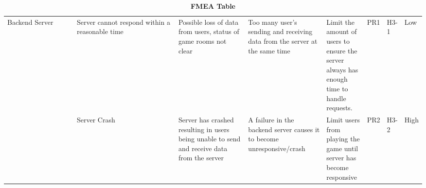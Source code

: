 \documentclass{article}
\begin{document}
\begin{table}[H]
\begin{adjustbox}{width=(/5)}
\begin{tabular}{|p{0.20\linewidth} | p{0.30\linewidth} | p{0.20\linewidth}|  p{0.20\linewidth}|  p{0.30\linewidth}|  p{0.07\linewidth}|  p{0.07\linewidth}|p{0.12\linewidth}| }
          \hline
          Backend Server                   &    Server cannot respond within a reasonable time         &     Possible loss of data from users, status of game rooms not clear    &    Too many user's sending and receiving data from the server at the same time    &     Limit the amount of users to ensure the server always has enough time to handle requests.      &   PR1          &  H3-1            &      Low            \\
                                   &     Server Crash                   & Server has crashed resulting in users being unable to send and receive data from the server                          &   A failure in the backend server causes it to become unresponsive/crash                       &  Limit users from playing the game until server has become responsive                               &  PR2           &  H3-2             &  High                 \\
          \hline
    \end{tabular}
    \end{adjustbox}
    \caption{\bf FMEA Table}
    \label{tab:FMEA1}
\end{table}
\end{document}

